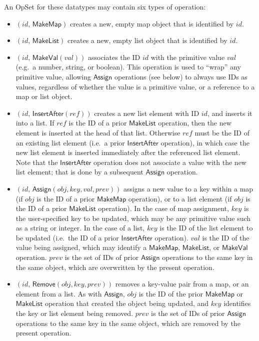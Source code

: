 An OpSet for these datatypes may contain six types of operation:
\begin{itemize}
    \item $(\mathit{id},\, \mathsf{MakeMap})$ creates a new, empty map object that is identified by $\mathit{id}$.
    \item $(\mathit{id},\, \mathsf{MakeList})$ creates a new, empty list object that is identified by $\mathit{id}$.
    \item $(\mathit{id},\, \mathsf{MakeVal}(\mathit{val}))$ associates the ID $\mathit{id}$ with the primitive value $\mathit{val}$ (e.g.\ a number, string, or boolean).
        This operation is used to ``wrap'' any primitive value, allowing $\mathsf{Assign}$ operations (see below) to always use IDs as values, regardless of whether the value is a primitive value, or a reference to a map or list object.
    \item $(\mathit{id},\, \mathsf{InsertAfter}(\mathit{ref}))$ creates a new list element with ID $\mathit{id}$, and inserts it into a list.
        If $\mathit{ref}$ is the ID of a prior $\mathsf{MakeList}$ operation, then the new element is inserted at the head of that list.
        Otherwise $\mathit{ref}$ must be the ID of an existing list element (i.e.\ a prior $\mathsf{InsertAfter}$ operation), in which case the new list element is inserted immediately after the referenced list element.
        Note that the $\mathsf{InsertAfter}$ operation does not associate a value with the new list element; that is done by a subsequent $\mathsf{Assign}$ operation.
    \item $(\mathit{id},\, \mathsf{Assign}(\mathit{obj}, \mathit{key}, \mathit{val}, \mathit{prev}))$ assigns a new value to a key within a map (if $\mathit{obj}$ is the ID of a prior $\mathsf{MakeMap}$ operation), or to a list element (if $\mathit{obj}$ is the ID of a prior $\mathsf{MakeList}$ operation).
        In the case of map assignment, $\mathit{key}$ is the user-specified key to be updated, which may be any primitive value such as a string or integer.
        In the case of a list, $\mathit{key}$ is the ID of the list element to be updated (i.e.\ the ID of a prior $\mathsf{InsertAfter}$ operation).
        $\mathit{val}$ is the ID of the value being assigned, which may identify a $\mathsf{MakeMap}$, $\mathsf{MakeList}$, or $\mathsf{MakeVal}$ operation.
        $\mathit{prev}$ is the set of IDs of prior $\mathsf{Assign}$ operations to the same key in the same object, which are overwritten by the present operation.
    \item $(\mathit{id},\, \mathsf{Remove}(\mathit{obj}, \mathit{key}, \mathit{prev}))$ removes a key-value pair from a map, or an element from a list.
        As with $\mathsf{Assign}$, $\mathit{obj}$ is the ID of the prior $\mathsf{MakeMap}$ or $\mathsf{MakeList}$ operation that created the object being updated, and $\mathit{key}$ identifies the key or list element being removed.
        $\mathit{prev}$ is the set of IDs of prior $\mathsf{Assign}$ operations to the same key in the same object, which are removed by the present operation.
\end{itemize}

